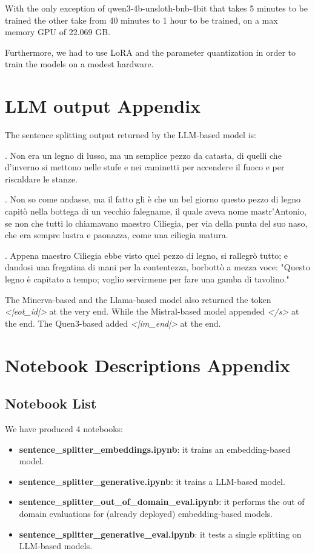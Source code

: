 \documentclass[11pt]{article}
\begin{document}
With the only exception of qwen3-4b-unsloth-bnb-4bit that takes 5 minutes
to be trained the other take from 40 minutes to 1 hour to be trained,
on a max memory GPU of 22.069 GB.

Furthermore,
we had to use LoRA and the parameter quantization in order to train the models
on a modest hardware.

\appendix

\section{LLM output Appendix}
\label{sec:appendix1}

The sentence splitting output returned by the LLM-based model is:

{\selectfont

. Non era un legno di lusso, ma un semplice pezzo da catasta, di quelli che d’inverno si mettono nelle stufe e nei caminetti per accendere il fuoco e per riscaldare le stanze.

. Non so come andasse, ma il fatto gli è che un bel giorno questo pezzo di legno capitò nella bottega di un vecchio falegname, il quale aveva nome mastr’Antonio, se non che tutti lo chiamavano maestro Ciliegia, per via della punta del suo naso, che era sempre lustra e paonazza, come una ciliegia matura.

. Appena maestro Ciliegia ebbe visto quel pezzo di legno, si rallegrò tutto; e dandosi una fregatina di mani per la contentezza, borbottò a mezza voce: "Questo legno è capitato a tempo; voglio servirmene per fare una gamba di tavolino."

}

The Minerva-based and the Llama-based model also returned the token \emph{<|eot\_id|>}
at the very end. While the Mistral-based model appended \emph{</s>} at the end.
The Quen3-based added \emph{<|im\_end|>} at the end.

\section{Notebook Descriptions Appendix}
\label{sec:appendix2}

\subsection{Notebook  List}

We have produced 4 notebooks:

 \begin{itemize}
	\item \textbf{sentence\_splitter\_embeddings.ipynb}: it trains an embedding-based
	model.
	\item \textbf{sentence\_splitter\_generative.ipynb}: it trains a LLM-based model.
	\item \textbf{sentence\_splitter\_out\_of\_domain\_eval.ipynb}: it performs the out of domain 
	evaluations for (already deployed) embedding-based models.
	\item \textbf{sentence\_splitter\_generative\_eval.ipynb}: it tests a single splitting on
	LLM-based models.
\end{itemize}
\end{document}
